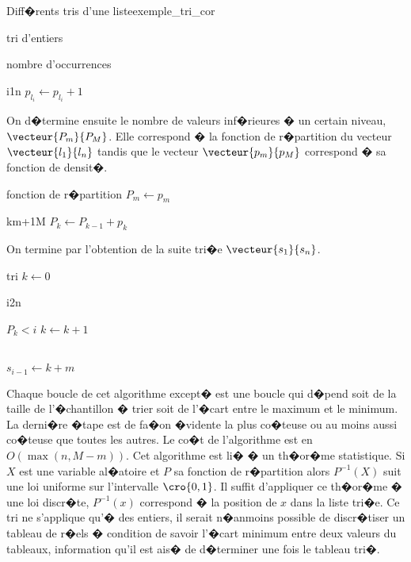 \begin{xexempleprog2}{Diff�rents tris d'une liste}{exemple_tri_cor}
\begin{xalgorithm}{tri d'entiers}
\begin{xalgostep}{nombre d'occurrences}
            \begin{xfor2}{i}{1}{n}
                $p_{l_i} \longleftarrow p_{l_i} + 1$
            \end{xfor2}
            \end{xalgostep}
            
            On d�termine ensuite le nombre de valeurs inf�rieures � un certain niveau, $\vecteur{P_m}{P_M}$. Elle
            correspond � la fonction de r�partition du vecteur $\vecteur{l_1}{l_n}$ tandis que le vecteur
            $\vecteur{p_m}{p_M}$ correspond � sa fonction de densit�.
            
            \begin{xalgostep}{fonction de r�partition}\label{tri_entier_dens}
            $P_m \longleftarrow p_m$
            \begin{xfor2}{k}{m+1}{M}
                $P_k \longleftarrow P_{k-1} + p_k$
            \end{xfor2}
            \end{xalgostep}
            
            On termine par l'obtention de la suite tri�e $\vecteur{s_1}{s_n}$.

            \begin{xalgostep}{tri}\label{tri_entier_tri}
						$ k \longleftarrow 0 $  \\
            \begin{xfor2}{i}{2}{n}
            		\begin{xwhile2}{ $P_k < i$ }
            				$k \longleftarrow k + 1$
            		\end{xwhile2} \\
                $s_{i-1} \longleftarrow k + m$
            \end{xfor2}
            \end{xalgostep}
            
            \end{xalgorithm}


Chaque boucle de cet algorithme except� est une boucle qui d�pend soit de la taille de l'�chantillon � trier soit de l'�cart entre le maximum et le minimum. La derni�re �tape est de fa�on �vidente la plus co�teuse ou au moins aussi co�teuse que toutes les autres. Le co�t de l'algorithme est en $O(\max(n,M-m))$. Cet algorithme est li� � un th�or�me statistique. Si $X$ est une variable al�atoire et $P$ sa fonction de r�partition alors $P^{-1}(X)$ suit une loi uniforme sur l'intervalle $\cro{0,1}$. Il suffit d'appliquer ce th�or�me � une loi discr�te, $P^{-1}(x)$ correspond � la position de $x$ dans la liste tri�e. Ce tri ne s'applique qu'� des entiers, il serait n�anmoins possible de discr�tiser un tableau de r�els � condition de savoir l'�cart minimum entre deux valeurs du tableaux, information qu'il est ais� de d�terminer une fois le tableau tri�.

\end{xexempleprog2}






